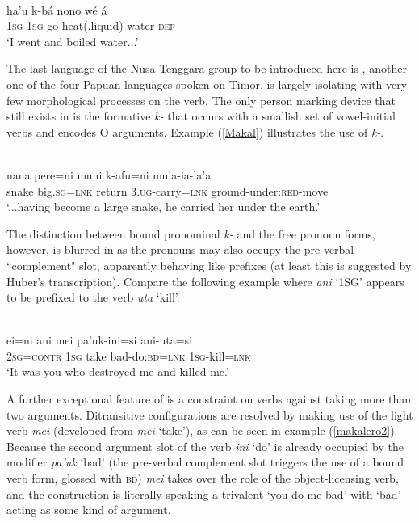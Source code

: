 \ea \label{tetun02}
\\
\gll ha'u k-bá nono wé á \\
\textsc{1}\textsc{sg} \textsc{1}\textsc{sg}-go heat(.liquid) water \textsc{def} \\
\glft `I went and boiled water...'
\z

The last language of the Nusa Tenggara group to be introduced here is , another one of the four Papuan languages spoken on Timor.  is largely isolating with very few morphological processes on the verb. The only person marking device that still exists in  is the formative \textit{k-} that occurs with a smallish set of vowel-initial verbs and encodes O arguments. Example (\ref{Makal}) illustrates the use of \textit{k-}.

\ea \label{Makal}
\\
\gll nana pere=ni muni k-afu=ni mu’a-ia-la’a \\
snake big.\textsc{sg}=\textsc{lnk} return \textsc{3}.\textsc{ug}-carry=\textsc{lnk} ground-under:\textsc{red}-move \\
\glft `...having become a large snake, he carried her under the earth.’ 
\z

The distinction between bound pronominal \textit{k-} and the free pronoun forms, however, is blurred in  as the pronouns may also occupy the pre-verbal ``complement" slot, apparently behaving like prefixes (at least this is suggested by Huber's transcription). Compare the following example where \textit{ani} `1SG' appears to be prefixed to the verb \textit{uta} `kill'.

\ea \label{makalero2}
\\
\gll ei=ni ani mei pa’uk-ini=si ani-uta=si \\
\textsc{2}\textsc{sg}=\textsc{contr} \textsc{1}\textsc{sg} take bad-do:\textsc{bd}=\textsc{lnk} \textsc{1}\textsc{sg}-kill=\textsc{lnk} \\
\glft `It was you who destroyed me and killed me.’ 
\z

A further exceptional feature of  is a constraint on verbs against taking more than two arguments. Ditransitive configurations are resolved by making use of the light verb \textit{mei} (developed from \textit{mei} `take'), as can be seen in example (\ref{makalero2}). Because the second argument slot of the verb \textit{ini} `do' is already occupied by the modifier \textit{pa'uk} `bad' (the pre-verbal complement slot triggers the use of a bound verb form, glossed with \textsc{bd}) \textit{mei} takes over the role of the object-licensing verb, and the construction is literally speaking a trivalent `you do me bad' with `bad' acting as some kind of argument.

